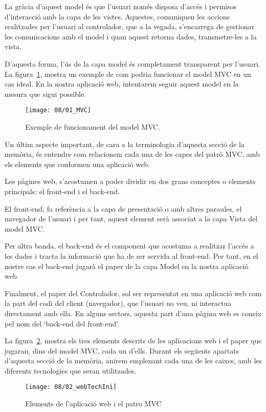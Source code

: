     La gràcia d'aquest model és que l'usuari només disposa d'accés i permisos d'interacció amb la capa de les vistes. Aquestes, comuniquen les accions realitzades per l'usuari al controlador, que a la vegada, s'encarrega de gestionar les comunicacions amb el model i quan aquest retorna dades, transmetre-les a la vista.

    D'aquesta forma, l'ús de la capa model és completament transparent per l'usuari. La figura~\ref{fig:MVC}, mostra un exemple de com podria funcionar el model MVC en un cas ideal. En la nostra aplicació web, intentarem seguir aquest model en la mesura que sigui possible.

    \begin{figure}[h]
        \texttt{[image: 08/01\_MVC]}
        \centering
        \caption{Exemple de funcionament del model MVC.}\label{fig:MVC}
    \end{figure}

    Un últim aspecte important, de cara a la terminologia d'aquesta secció de la memòria, és entendre com relacionem cada una de les capes del patrò MVC, amb els elements que conformen una aplicació web.

    Les pàgines web, s'acostumen a poder dividir en dos grans conceptes o elements principals: el front-end i el back-end.

    El front-end, fa referència a la capa de presentació o amb altres paraules, el navegador de l'usuari i per tant, aquest element serà associat a la capa Vista del model MVC.

    Per altra banda, el back-end és el component que acostuma a realitzar l'accés a les dades i tracta la informació que ha de ser servida al front-end. Per tant, en el nostre cas el back-end jugarà el paper de la capa Model en la nostra aplicació web.

    Finalment, el paper del Controlador, sol ser representat en una aplicació web com la part del codi del client (navegador), que l'usuari no veu, ni interactua directament amb ella. En alguns sectors, aquesta part d'una pàgina web es coneix pel nom del `back-end del front-end'.

    La figura~\ref{fig:webElementsEmpty}, mostra els tres elements descrits de les aplicacions web i el paper que jugaran, dins del model MVC, cada un d'ells. Durant els següents apartats d'aquesta secció de la memòria, anirem emplenant cada una de les caixes, amb les diferents tecnologies que seran utilitzades.

    \begin{figure}[h]
        \texttt{[image: 08/02\_webTechIni]}
        \centering
        \caption{Elements de l'aplicació web i el patro MVC}\label{fig:webElementsEmpty}
    \end{figure}

